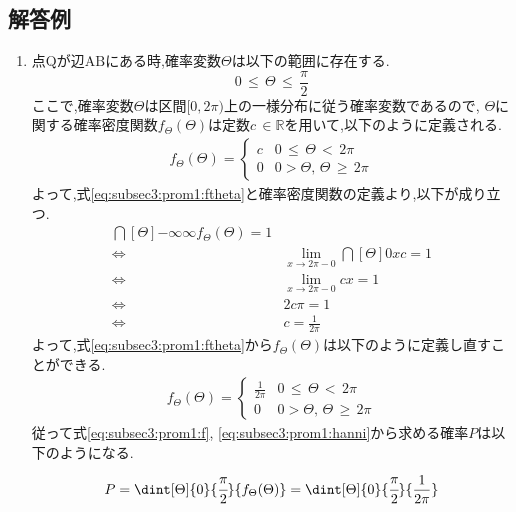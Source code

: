 \newpage

\subsection{解答例}
\begin{enumerate}[(1)]
  \setlength{\itemsep}{10pt}
\item 点$\mathrm{Q}$が辺$\mathrm{AB}$にある時,確率変数$\Theta$は以下の範囲に存在する.
  \begin{equation}
    0\, \leq\, \Theta\, \leq\, \frac{\pi}{2}\label{eq:subsec3:prom1:hanni}
  \end{equation}
  ここで,確率変数$\Theta$は区間$[0, 2\pi)$上の一様分布に従う確率変数であるので,
  $\Theta$に関する確率密度関数$f_{\Theta}(\Theta)$は定数$c\, \in \mathbb{R}$を用いて,以下のように定義される.
  \begin{align}
    f_{\Theta}(\Theta) = 
    \begin{cases}
      c & 0\, \leq\, \Theta\, <\, 2\pi\\
      0 & 0 > \Theta,\, \Theta\, \geq\, 2\pi
    \end{cases} \label{eq:subsec3:prom1:ftheta}
  \end{align}
  よって,式\eqref{eq:subsec3:prom1:ftheta}と確率密度関数の定義より,以下が成り立つ.
  \begin{align*}
    \dint[\Theta]{-\infty}{\infty}{f_{\Theta}(\Theta)} = 1\\
    \Longleftrightarrow\; &\lim_{x \to 2\pi-0}\dint[\Theta]{0}{x}{c} = 1\\
    \Longleftrightarrow\; &\lim_{x \to 2\pi-0}cx = 1\\
    \Longleftrightarrow\; &2c\pi = 1\\
    \Longleftrightarrow\; &c = \frac{1}{2\pi}
  \end{align*}
  よって,式\eqref{eq:subsec3:prom1:ftheta}から$f_{\Theta}(\Theta)$は以下のように定義し直すことができる.
  \begin{align}
    f_{\Theta}(\Theta) = 
    \begin{cases}
      \frac{1}{2\pi} & 0\, \leq\, \Theta\, <\, 2\pi\\
      0 & 0 > \Theta,\, \Theta\, \geq\, 2\pi
    \end{cases}\label{eq:subsec3:prom1:f}
  \end{align}
  従って式\eqref{eq:subsec3:prom1:f}, \eqref{eq:subsec3:prom1:hanni}から求める確率$P$は以下のようになる.
  \begin{align*}
    P &= \dint[\Theta]{0}{\cfrac{\pi}{2}}{f_{\Theta}(\Theta)} = \dint[\Theta]{0}{\cfrac{\pi}{2}}{\frac{1}{2\pi}}\\

\end{align*}
\end{enumerate}
